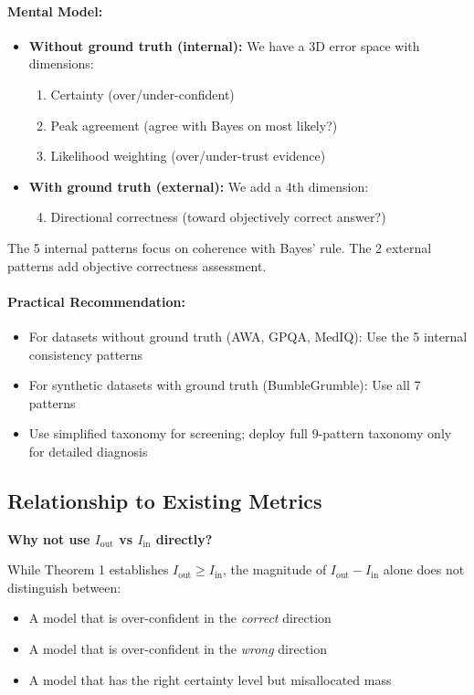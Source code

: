 \documentclass{article}
\theoremstyle{definition}
\begin{document}
\paragraph{Mental Model:}
\begin{itemize}
    \item \textbf{Without ground truth (internal):} We have a 3D error space with dimensions:
    \begin{enumerate}
        \item Certainty (over/under-confident)
        \item Peak agreement (agree with Bayes on most likely?)
        \item Likelihood weighting (over/under-trust evidence)
    \end{enumerate}

    \item \textbf{With ground truth (external):} We add a 4th dimension:
    \begin{enumerate}
        \setcounter{enumi}{3}
        \item Directional correctness (toward objectively correct answer?)
    \end{enumerate}
\end{itemize}

The 5 internal patterns focus on coherence with Bayes' rule. The 2 external patterns add objective correctness assessment.

\paragraph{Practical Recommendation:}
\begin{itemize}
    \item For datasets without ground truth (AWA, GPQA, MedIQ): Use the 5 internal consistency patterns
    \item For synthetic datasets with ground truth (BumbleGrumble): Use all 7 patterns
    \item Use simplified taxonomy for screening; deploy full 9-pattern taxonomy only for detailed diagnosis
\end{itemize}

\subsection{Relationship to Existing Metrics}

\textbf{Why not use $I_{\text{out}}$ vs $I_{\text{in}}$ directly?}

While Theorem 1 establishes $I_{\text{out}} \geq I_{\text{in}}$, the magnitude of $I_{\text{out}} - I_{\text{in}}$ alone does not distinguish between:
\begin{itemize}
    \item A model that is over-confident in the \emph{correct} direction
    \item A model that is over-confident in the \emph{wrong} direction
    \item A model that has the right certainty level but misallocated mass
\end{itemize}
\end{document}
